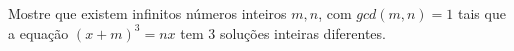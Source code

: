 Mostre que existem infinitos números inteiros \(m,n\), com \(gcd(m,n)=1\) tais que a equação \((x+m)^{3}=nx\) tem 3 soluções inteiras diferentes.
